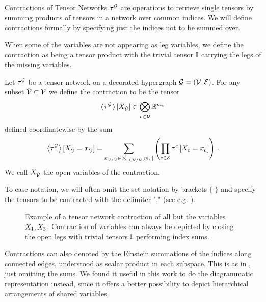 

Contractions of Tensor Networks $\tau^{\mathcal{G}}$ are operations to retrieve single tensors by summing products of tensors in a network over common indices.
We will define contractions formally by specifying just the indices not to be summed over.

When some of the variables are not appearing as leg variables, we define the contraction as being a tensor product with the trivial tensor $\mathbb{I}$ carrying the legs of the missing variables.

\begin{definition}\label{def:contraction}
	Let $\tau^{\mathcal{G}}$ be a tensor network on a decorated hypergraph $\mathcal{G}=(\mathcal{V},\mathcal{E})$.
	For any subset $\tilde{\mathcal{V}}\subset\mathcal{V}$ we define the contraction  to be the tensor
	\begin{align}
		\left\langle \tau^{\mathcal{G}}\right\rangle \left[ X_{\tilde{\mathcal{V}}} \right] \in \bigotimes_{v\in\tilde{\mathcal{V}}} \mathbb{R}^{m_{v}}
	\end{align}
	defined coordinatewise by the sum
	\begin{align}
		\left\langle \tau^{\mathcal{G}}\right\rangle \left[ X_{\tilde{\mathcal{V}}}=x_{\tilde{\mathcal{V}}} \right] =
		\sum_{x_{\mathcal{V}/\tilde{\mathcal{V}}} \in\,\bigtimes_{v\in\mathcal{V}/\tilde{\mathcal{V}}}[m_{v}]}
		\left( \prod_{e\in\mathcal{E}}\tau^{e}\left[X_{e}=x_{e}\right] \right) \, .
	\end{align}
	We call $X_{\tilde{\mathcal{V}}}$ the open variables of the contraction.
\end{definition}

To ease notation, we will often omit the set notation by brackets $\{\cdot\}$ and specify the tensors to be contracted with the delimiter "," (see e.g. ).

\begin{figure}
	\begin{center}
		
	\end{center}
	\caption{
		Example of a tensor network contraction of all but the variables $X_{1},X_{3}$.
		Contraction of variables can always be depicted by closing the open legs with trivial tensors $\mathbb{I}$ performing index sums.
	}\label{fig:contraction}
\end{figure}


\begin{remark}[Alternative Notations]
	Contractions can also denoted by the Einstein summations of the indices along connected edges, understood as scalar product in each subspace.
	This is as in , just omitting the sums.
	We found it useful in this work to do the diagrammatic representation instead, since it offers a better possibility to depict hierarchical arrangements of shared variables.
\end{remark}


